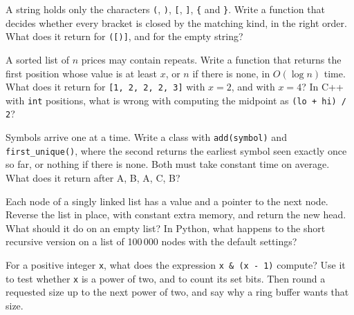 \begin{question}\label{iq:iv3:algorithms:5}
A string holds only the characters \texttt{(}, \texttt{)}, \texttt{[}, \texttt{]}, \texttt{\{} and \texttt{\}}. Write a function that decides whether every bracket is closed by the matching kind, in the right order. What does it return for \texttt{([)]}, and for the empty string?
\end{question}

\begin{question}\label{iq:iv3:algorithms:6}
A sorted list of $n$ prices may contain repeats. Write a function that returns the first position whose value is at least $x$, or $n$ if there is none, in $O(\log n)$ time. What does it return for \texttt{[1, 2, 2, 2, 3]} with $x = 2$, and with $x = 4$? In C++ with \texttt{int} positions, what is wrong with computing the midpoint as \texttt{(lo + hi) / 2}?
\end{question}

\begin{question}\label{iq:iv3:algorithms:7}
Symbols arrive one at a time. Write a class with \texttt{add(symbol)} and \texttt{first\_unique()}, where the second returns the earliest symbol seen exactly once so far, or nothing if there is none. Both must take constant time on average. What does it return after A, B, A, C, B?
\end{question}

\begin{question}\label{iq:iv3:algorithms:8}
Each node of a singly linked list has a value and a pointer to the next node. Reverse the list in place, with constant extra memory, and return the new head. What should it do on an empty list? In Python, what happens to the short recursive version on a list of 100\,000 nodes with the default settings?
\end{question}

\begin{question}\label{iq:iv3:algorithms:9}
For a positive integer \texttt{x}, what does the expression \texttt{x \& (x - 1)} compute? Use it to test whether \texttt{x} is a power of two, and to count its set bits. Then round a requested size up to the next power of two, and say why a ring buffer wants that size.
\end{question}

